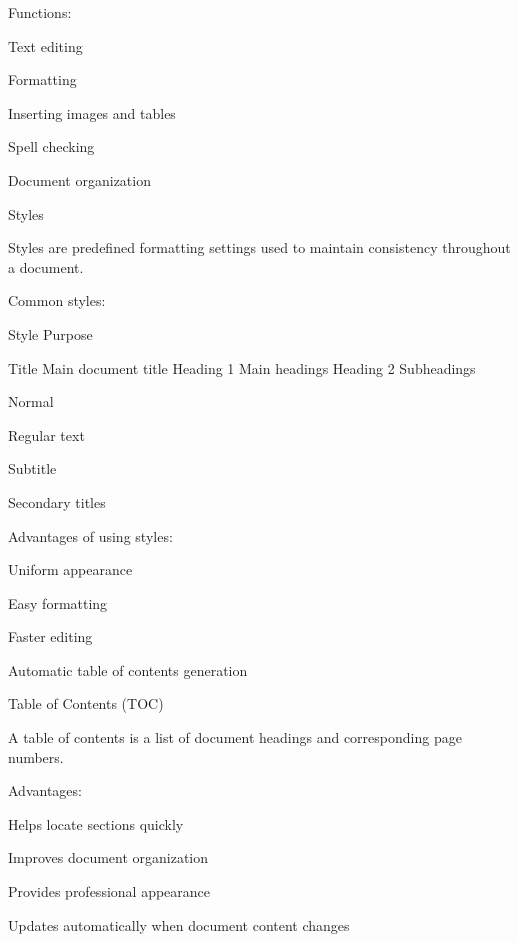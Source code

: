 \documentclass[10pt,a4paper]{article}
\begin{document}
\noindent Functions:\par
\noindent\textbullet\; Text editing\par
\noindent\textbullet\; Formatting\par
\noindent\textbullet\; Inserting images and tables\par
\clearpage
\noindent\textbullet\; Spell checking\par
\noindent\textbullet\; Document organization\par

\noindent Styles\par
\noindent Styles are predefined formatting settings used to maintain consistency throughout a document.\par

\noindent Common styles:\par
\noindent Style Purpose\par
\noindent Title Main document title Heading 1 Main headings Heading 2 Subheadings\par
\noindent Normal\par
\noindent Regular text\par
\noindent Subtitle\par
\noindent Secondary titles\par

\noindent Advantages of using styles:\par
\noindent\textbullet\; Uniform appearance\par
\noindent\textbullet\; Easy formatting\par
\noindent\textbullet\; Faster editing\par
\noindent\textbullet\; Automatic table of contents generation\par

\noindent Table of Contents (TOC)\par
\noindent A table of contents is a list of document headings and corresponding page numbers.\par

\noindent Advantages:\par
\noindent\textbullet\; Helps locate sections quickly\par
\noindent\textbullet\; Improves document organization\par
\noindent\textbullet\; Provides professional appearance\par
\noindent\textbullet\; Updates automatically when document content changes\par
\end{document}
